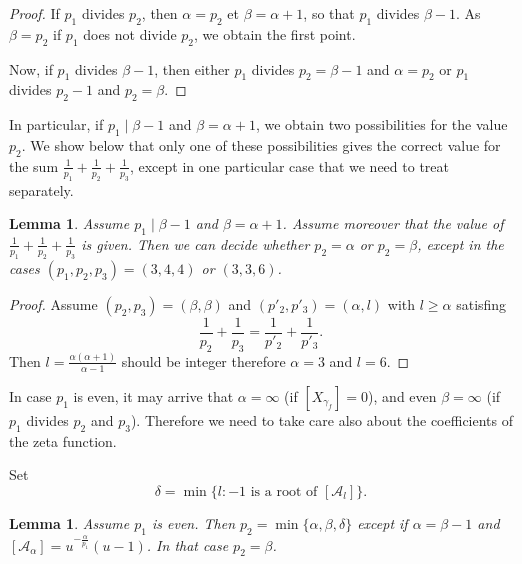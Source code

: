 \documentclass[12pt,a4paper,leqno]{amsart}
\newtheorem{lem}[thm]{Lemma}
\theoremstyle{definition}
\begin{document}
\begin{proof} If $p_1$ divides $p_2$, then $\alpha=p_2$ et $\beta=\alpha +1$, so that
  $p_1$ divides $\beta-1$. As $\beta=p_2$ if $p_1$ does not divide
  $p_2$, we obtain the first point.

Now, if $p_1$ divides $\beta-1$, then either $p_1$ divides $p_2=\beta-1$ and
$\alpha=p_2$ or  $p_1$ divides $p_2-1$ and $p_2=\beta$.
\end{proof}

In particular, if $p_1 \mid \beta -1$ and $\beta = \alpha +1$, we obtain
two possibilities for the value $p_2$. We show below that only
one of these possibilities gives the correct value for the sum
$\frac{1}{p_1}+\frac{1}{p_2}+\frac{1}{p_3}$, except in one particular
case that we need to treat separately.

\begin{lem}
Assume $p_1 \mid \beta -1$ and $\beta = \alpha +1$. Assume moreover
that the value of $\frac{1}{p_1}+\frac{1}{p_2}+\frac{1}{p_3}$ is
given. Then we can decide whether
$p_2=\alpha$ or $p_2=\beta$, except in the cases $(p_1,p_2,p_3)=(3,4,4)$ or $(3,3,6)$.
\end{lem}

\begin{proof}
Assume  $(p_2,p_3)=(\beta,\beta)$
and $(p'_2,p'_3)=(\alpha,l)$ with $l\geq \alpha$ satisfing
$$\frac{1}{p_2}+\frac{1}{p_3}=\frac{1}{p'_2}+\frac{1}{p'_3}.$$
Then $l=\frac{\alpha(\alpha+1)}{\alpha-1}$ should be integer therefore
$\alpha=3$ and $l=6$. 
\end{proof}

In case $p_1$ is even, it may arrive that $\alpha=\infty$ (if
$[X_{\gamma_f}]=0$), and even $\beta=\infty$ (if $p_1$ divides $p_2$
and $p_3$). Therefore we need to take care also about the coefficients of
the zeta function. 

Set
$$\delta=\min \{l: -1 \textrm{ is a root of } [\mathcal A_l] \}.$$ 
\begin{lem}
Assume $p_1$ is even. Then $p_2=\min \{\alpha,\beta,\delta\}$ except if
$\alpha = \beta -1$ and $[\mathcal
A_{\alpha}]=u ^{-\frac{\alpha}{p_1}}(u-1)$. In that case $p_2=\beta$.
\end{lem}
\end{document}
